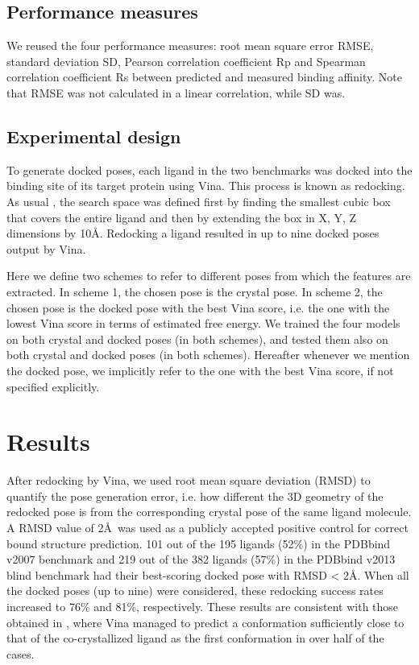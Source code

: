 \subsection{Performance measures}

We reused the four performance measures: root mean square error RMSE, standard deviation SD, Pearson correlation coefficient Rp and Spearman correlation coefficient Rs between predicted and measured binding affinity. Note that RMSE was not calculated in a linear correlation, while SD was.

\subsection{Experimental design}

To generate docked poses, each ligand in the two benchmarks was docked into the binding site of its target protein using Vina. This process is known as redocking. As usual \citep{1362}, the search space was defined first by finding the smallest cubic box that covers the entire ligand and then by extending the box in X, Y, Z dimensions by 10\AA. Redocking a ligand resulted in up to nine docked poses output by Vina.

Here we define two schemes to refer to different poses from which the features are extracted. In scheme 1, the chosen pose is the crystal pose. In scheme 2, the chosen pose is the docked pose with the best Vina score, i.e. the one with the lowest Vina score in terms of estimated free energy. We trained the four models on both crystal and docked poses (in both schemes), and tested them also on both crystal and docked poses (in both schemes). Hereafter whenever we mention the docked pose, we implicitly refer to the one with the best Vina score, if not specified explicitly.

\section{Results}

After redocking by Vina, we used root mean square deviation (RMSD) to quantify the pose generation error, i.e. how different the 3D geometry of the redocked pose is from the corresponding crystal pose of the same ligand molecule. A RMSD value of 2\AA\ was used as a publicly accepted positive control for correct bound structure prediction. 101 out of the 195 ligands (52\%) in the PDBbind v2007 benchmark and 219 out of the 382 ligands (57\%) in the PDBbind v2013 blind benchmark had their best-scoring docked pose with RMSD < 2\AA. When all the docked poses (up to nine) were considered, these redocking success rates increased to 76\% and 81\%, respectively. These results are consistent with those obtained in \citep{1362}, where Vina managed to predict a conformation sufficiently close to that of the co-crystallized ligand as the first conformation in over half of the cases.

